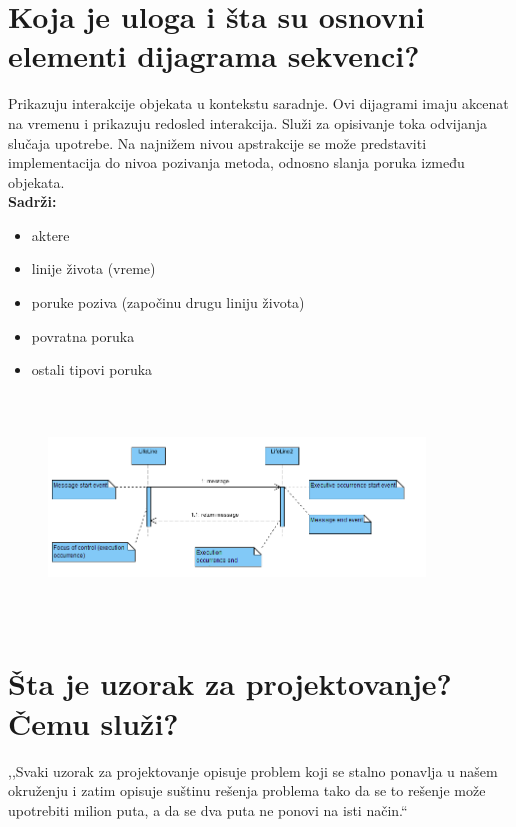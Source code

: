 \documentclass[a4paper]{article}
\begin{document}
\section{Koja je uloga i šta su osnovni elementi dijagrama sekvenci?}
  Prikazuju interakcije objekata u kontekstu saradnje. Ovi dijagrami imaju akcenat na vremenu i
  prikazuju redosled interakcija. Služi za opisivanje toka odvijanja slučaja upotrebe. 
  Na najnižem nivou apstrakcije se može predstaviti implementacija do nivoa pozivanja
  metoda, odnosno slanja poruka između objekata. \\
  \textbf{Sadrži:}
  \begin{itemize}
    \item aktere
    \item linije života (vreme)
    \item poruke poziva (započinu drugu liniju života)
    \item povratna poruka
    \item ostali tipovi poruka
  \end{itemize}
  \begin{figure}[H]
    \begin{center}
        \includegraphics[width=100mm,height=60mm]{Slike/uml_sekvenci.png}
    \end{center}
  \end{figure} 

\section{Šta je uzorak za projektovanje? Čemu služi?}
  ,,Svaki uzorak za projektovanje opisuje problem koji se stalno ponavlja u našem okruženju i zatim
  opisuje suštinu rešenja problema tako da se to rešenje može upotrebiti milion puta, a da se
  dva puta ne ponovi na isti način.`` 
  \\
\end{document}

